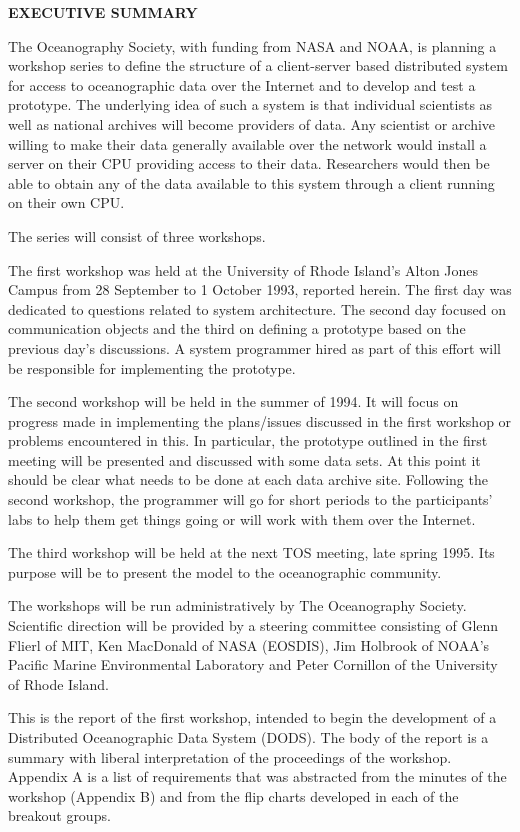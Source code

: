 \begin{center} 
{\bf EXECUTIVE SUMMARY}
\end{center}

\noindent
The Oceanography Society, with funding from NASA and NOAA, is
planning a workshop series to define the structure of a client-server based
distributed system for access to oceanographic data over the Internet and to
develop and test a prototype.  The underlying idea of such a system is that
individual scientists as well as national archives will become providers of
data.  Any scientist or archive willing to make their data generally
available over the network would install a server on their CPU providing
access to their data. Researchers would then be able to obtain any of the
data available to this system through a client running on their own CPU.

The series will consist of three workshops.

The first workshop was held at the University of Rhode Island's Alton
Jones Campus from 28 September to 1 October 1993, reported herein. The
first day was dedicated to questions related to system architecture.
The second day focused on communication objects and the third on
defining a prototype based on the previous day's discussions. A system
programmer hired as part of this effort will be responsible for
implementing the prototype.

The second workshop will be held in the summer of 1994. It will focus 
on progress made in implementing the plans/issues discussed in the first 
workshop or problems encountered in this. In particular, the prototype 
outlined in the first meeting will be presented and discussed with some 
data sets. At this point it should be clear what needs to be done at 
each data archive site. Following the second workshop, the programmer 
will go for short periods to the participants' labs to help them get 
things going or will work with them over the Internet.

The third workshop will be held at the next TOS meeting, late spring 1995. 
Its purpose will be to present the model to the oceanographic community.

The workshops will be run administratively by The Oceanography Society. 
Scientific direction will be provided by a steering committee consisting 
of Glenn Flierl of MIT, Ken MacDonald of NASA (EOSDIS), Jim Holbrook of 
NOAA's Pacific Marine Environmental Laboratory and Peter Cornillon of the 
University of Rhode Island.

This is the report of the first workshop, intended to begin the
development of a Distributed Oceanographic Data System (DODS). The
body of the report is a summary with liberal interpretation of the
proceedings of the workshop. Appendix A is a list of requirements that
was abstracted from the minutes of the workshop (Appendix B) and from
the flip charts developed in each of the breakout groups.

